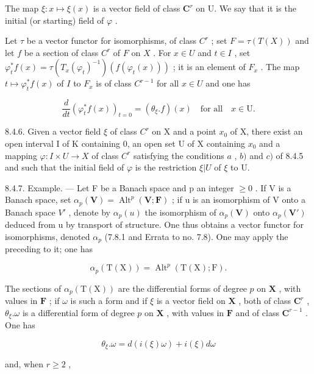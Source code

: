 The map \(\xi\colon x\mapsto\xi(x)\) is a vector field of class \(\mathbf{C}^{r}\) on U. We say that it is the initial (or starting) field of \(\varphi\) .

Let \(\tau\) be a vector functor for isomorphisms, of class \(C^r\) ; set \(F = \tau(T(X))\) and let \(f\) be a section of class \(C^r\) of \(F\) on \(X\) . For \(x \in U\) and \(t \in I\) , set \(\varphi_t^* f(x) = \tau(T_x(\varphi_t)^{-1})(f(\varphi_t(x)))\) ; it is an element of \(F_x\) . The map \(t \mapsto \varphi_t^* f(x)\) of \(I\) to \(F_x\) is of class \(C^{r-1}\) for all \(x \in U\) and one has

\[
\frac {d}{d t} \left(\varphi_ {t} ^ {*} f (x)\right) _ {t = 0} = \left(\theta_ {\xi}. f\right) (x) \quad \text {for all} \quad x \in \mathrm{U}.\tag{2}
\]

8.4.6. Given a vector field \(\xi\) of class \(C^r\) on X and a point \(x_0\) of X, there exist an open interval I of K containing 0, an open set U of X containing \(x_0\) and a mapping \(\varphi: I \times U \to X\) of class \(C^r\) satisfying the conditions \(a\) , \(b)\) and \(c)\) of 8.4.5 and such that the initial field of \(\varphi\) is the restriction \(\xi|U\) of \(\xi\) to U.

8.4.7. Example. --- Let F be a Banach space and p an integer \(\geqslant0\) . If V is a Banach space, set \(\alpha_{p}(\mathbf{V}) = \operatorname{Alt}^{p}(\mathbf{V}; \mathbf{F})\) ; if u is an isomorphism of V onto a Banach space \(V'\) , denote by \(\alpha_{p}(u)\) the isomorphism of \(\alpha_{p}(\mathbf{V})\) onto \(\alpha_{p}(\mathbf{V}')\) deduced from u by transport of structure. One thus obtains a vector functor for isomorphisms, denoted \(\alpha_{p}\) (7.8.1 and Errata to no. 7.8). One may apply the preceding to it; one has

\[
\alpha_ {p} (\mathrm{T} (\mathrm{X})) = \operatorname{Alt}^{p}(\mathrm{T} (\mathrm{X}); \mathrm{F}).
\]

The sections of \(\alpha_{p}(\mathrm{T}(\mathrm{X}))\) are the differential forms of degree \(p\) on \(\mathbf{X}\) , with values in \(\mathbf{F}\) ; if \(\omega\) is such a form and if \(\xi\) is a vector field on \(\mathbf{X}\) , both of class \(\mathbf{C}^{r}\) , \(\theta_{\xi}.\omega\) is a differential form of degree \(p\) on \(\mathbf{X}\) , with values in \(\mathbf{F}\) and of class \(\mathbf{C}^{r-1}\) . One has

\[
\theta_ {\xi}. \omega = d (i (\xi) \omega) + i (\xi) d \omega\tag{3}
\]

and, when \(r \geqslant 2\) ,


